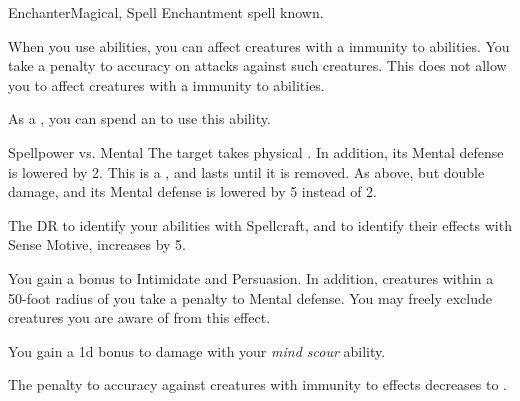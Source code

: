     \begin{feat}{Enchanter}{Magical, Spell}
        \featpre Enchantment spell known.
        \featben

         When you use  abilities, you can affect creatures with a  immunity to  abilities.
        You take a  penalty to accuracy on attacks against such creatures.
        This does not allow you to affect creatures with a  immunity to  abilities.

         As a , you can spend an  to use this ability.
        \begin{ability}
            \begin{spelltargetinginfo}
            \end{spelltargetinginfo}
            \begin{spelleffects}
                \begin{spellattack}{Spellpower vs. Mental} %
                    \spellsuccess The target takes physical .
                    In addition, its Mental defense is lowered by 2.
                    This is a , and lasts until it is removed.
                    \spellcritical As above, but double damage, and its Mental defense is lowered by 5 instead of 2.
                \end{spellattack}
            \end{spelleffects}
        \end{ability}

         The DR to identify your  abilities with Spellcraft, and to identify their effects with Sense Motive, increases by 5.

         You gain a  bonus to Intimidate and Persuasion.
        In addition, creatures within a 50-foot radius  of you take a  penalty to Mental defense.
        You may freely exclude creatures you are aware of from this effect.

         You gain a \plus1d bonus to damage with your \textit{mind scour} ability. 

         The penalty to accuracy against creatures with  immunity to  effects decreases to .


\end{feat}
